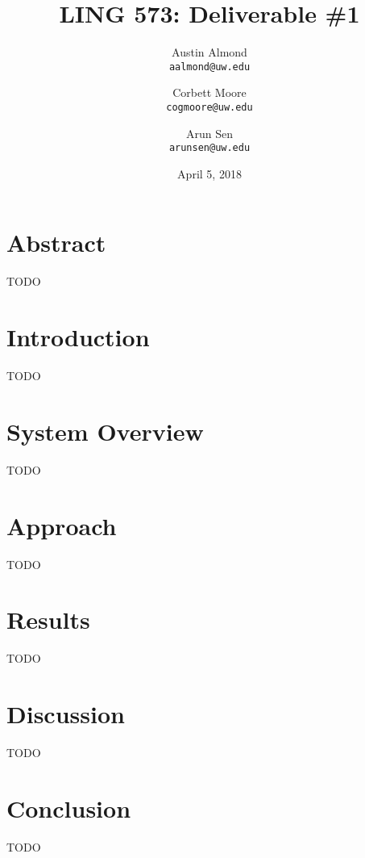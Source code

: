 \documentclass{article}
\begin{document}
	\title{LING 573: Deliverable \#1}
	\author{
		Austin Almond\\
		\texttt{aalmond@uw.edu}
		\and
		Corbett Moore\\
		\texttt{cogmoore@uw.edu}
		\and
		Arun Sen\\
		\texttt{arunsen@uw.edu}
	}
	\date{April 5, 2018}
	\maketitle

	\section*{Abstract}

	TODO

	\section*{Introduction}

	TODO

	\section*{System Overview}

	TODO

	\section*{Approach}

	TODO

	\section*{Results}

	TODO

	\section*{Discussion}

	TODO

	\section*{Conclusion}

	TODO

	\nocite{*}

	
	
\end{document}
